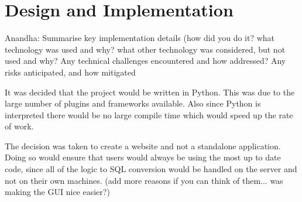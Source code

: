 \documentclass[a4paper, 11pt]{article}
\begin{document}

\section{Design and Implementation}
  Anandha: Summarise key implementation details (how did you do it? what technology was
  used and why? what other technology was considered, but not used and why?
  Any technical challenges encountered and how addressed?  Any risks
  anticipated, and how mitigated

  It was decided that the project would be written in Python. This was due to
  the large number of plugins and frameworks available. Also since Python is
  interpreted there would be no large compile time which would speed up the rate
  of work.

  The decision was taken to create a website and not a standalone application.
  Doing so would ensure that users would always be using the most up to date
  code, since all of the logic to SQL conversion would be handled on the server
  and not on their own machines. (add more reasons if you can think of them...
  was making the GUI nice easier?)


                 
\end{document}
